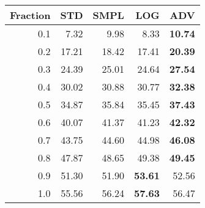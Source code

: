 \documentclass{standalone}
\begin{document}
\begin{tabular}{r|rrrr}
      \toprule
      Fraction & STD & SMPL & LOG & ADV\\
      \midrule
      0.1 & 7.32 & 9.98 & 8.33 & \textbf{10.74}\\
  0.2 & 17.21 & 18.42 & 17.41 & \textbf{20.39}\\
  0.3 & 24.39 & 25.01 & 24.64 & \textbf{27.54}\\
  0.4 & 30.02 & 30.88 & 30.77 & \textbf{32.38}\\
  0.5 & 34.87 & 35.84 & 35.45 & \textbf{37.43}\\
  0.6 & 40.07 & 41.37 & 41.23 & \textbf{42.32}\\
  0.7 & 43.75 & 44.60 & 44.98 & \textbf{46.08}\\
  0.8 & 47.87 & 48.65 & 49.38 & \textbf{49.45}\\
  0.9 & 51.30 & 51.90 & \textbf{53.61} & 52.56\\
  1.0 & 55.56 & 56.24 & \textbf{57.63} & 56.47\\
  \bottomrule
\end{tabular}
\end{document}
